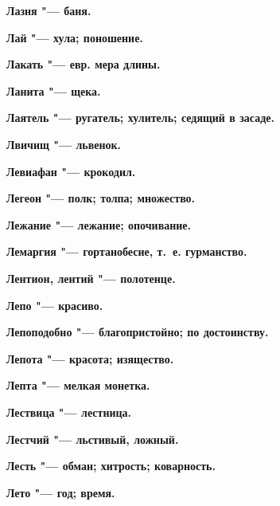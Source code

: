 \begin{multicols}{2}
\bfseries Лазня\normalfont{} "--- баня. 




\bfseries Лай\normalfont{} "--- хула; поношение. 




\bfseries Лакать\normalfont{} "--- евр. мера длины. 




\bfseries Ланита\normalfont{} "--- щека. 




\bfseries Лаятель\normalfont{} "--- ругатель; хулитель; седящий в засаде. 




\bfseries Лвичищ\normalfont{} "--- львенок. 




\bfseries Левиафан\normalfont{} "--- крокодил. 




\bfseries Легеон\normalfont{} "--- полк; толпа; множество. 




\bfseries Лежание\normalfont{} "--- лежание; опочивание. 




\bfseries Лемаргия\normalfont{} "--- гортанобесие, т.~е. гурманство. 




\bfseries Лентион, лентий\normalfont{} "--- полотенце. 




\bfseries Лепо\normalfont{} "--- красиво. 




\bfseries Лепоподобно\normalfont{} "--- благопристойно; по достоинству. 




\bfseries Лепота\normalfont{} "--- красота; изящество. 




\bfseries Лепта\normalfont{} "--- мелкая монетка. 




\bfseries Лествица\normalfont{} "--- лестница. 




\bfseries Лестчий\normalfont{} "--- льстивый, ложный. 




\bfseries Лесть\normalfont{} "--- обман; хитрость; коварность. 




\bfseries Лето\normalfont{} "--- год; время. 





\end{multicols}
